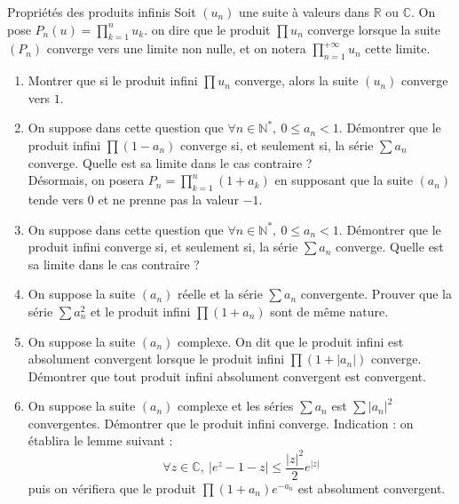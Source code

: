 \documentclass[french,a4paper]{article}
\newcommand{\N}{\mathbb{N}}
\newcommand{\R}{\mathbb{R}}
\newcommand{\C}{\mathbb{C}}
\newcommand{\st}{^*}
\theoremstyle{plain}
\theoremstyle{definition}
\theoremstyle{remark}
\begin{document}
\begin{ex}{Propriétés des produits infinis}
	Soit $(u_n)$ une suite à valeurs dans $\R$ ou $\C$. On pose $P_n(u)=\displaystyle\prod_{k=1}^{n}u_k$. on dire que le produit $\prod u_n$ converge lorsque la suite $(P_n)$ converge vers une limite non nulle, et on notera $\displaystyle\prod_{n=1}^{+\infty}u_n$ cette limite.
	\begin{enumerate}
		\item Montrer que si le produit infini $\prod u_n$ converge, alors la suite $(u_n)$ converge vers $1$.
		\item On suppose dans cette question que $\forall n\in\N\st,\ 0\leqslant a_n<1$. Démontrer que le produit infini $\prod(1-a_n)$ converge si, et seulement si, la série $\sum a_n$ converge. Quelle est sa limite dans le cas contraire ?\\ Désormais, on posera $P_n=\displaystyle\prod_{k=1}^{n}(1+a_k)$ en supposant que la suite $(a_n)$ tende vers $0$ et ne prenne pas la valeur $-1$.
		\item On suppose dans cette question que $\forall n\in\N\st,\ 0\leqslant a_n<1$. Démontrer que le produit infini converge si, et seulement si, la série $\sum a_n$ converge. Quelle est sa limite dans le cas contraire ?
		\item On suppose la suite $(a_n)$ réelle et la série $\sum a_n$ convergente. Prouver que la série $\sum a_n^2$ et le produit infini $\prod(1+a_n)$ sont de même nature.
		\item On suppose la suite $(a_n)$ complexe. On dit que le produit infini est absolument convergent lorsque le produit infini $\prod(1+\lvert a_n\rvert)$ converge. Démontrer que tout produit infini absolument convergent est convergent.
		\item On suppose la suite $(a_n)$ complexe et les séries $\sum a_n$ est $\sum\lvert a_n\rvert^2$ convergentes. Démontrer que le produit infini converge. Indication : on établira le lemme suivant : $$\forall z\in\C,\ \lvert e^{z}-1-z\rvert\leqslant\frac{\lvert z\rvert^2}{2}e^{\lvert z\rvert}$$ puis on vérifiera que le produit $\prod(1+a_n)e^{-a_n}$ est absolument convergent.		
	\end{enumerate}
\end{ex}
\end{document}
